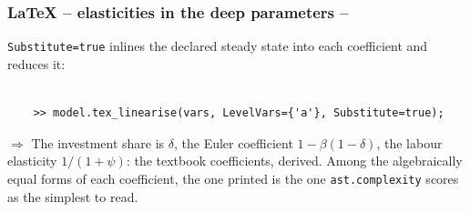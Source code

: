 \documentclass[10pt,slidestop]{beamer}
\theoremstyle{plain}
\begin{document}
\begin{frame}[c,fragile]
  \frametitle{LaTeX -- elasticities in the deep parameters --}

  \verb+Substitute=true+ inlines the declared steady state into each coefficient
  and reduces it:

  \begin{lstlisting}[style=MatlabConsole]

    >> model.tex_linearise(vars, LevelVars={'a'}, Substitute=true);
  \end{lstlisting}

  \medskip


  \medskip

  $\Rightarrow$ The investment share is $\delta$, the Euler coefficient
  $1-\beta\left(1-\delta\right)$, the labour elasticity $1/(1+\psi)$: the
  textbook coefficients, derived. Among the algebraically equal forms of each
  coefficient, the one printed is the one \verb+ast.complexity+ scores as the
  simplest to read.

\end{frame}


\end{document}

